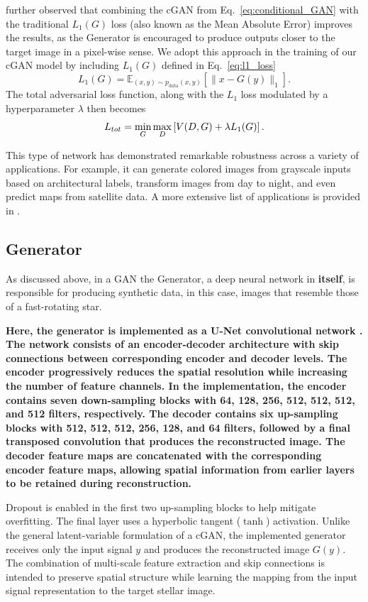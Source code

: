 \cite{isola2017image} further observed that combining the cGAN from Eq.~\ref{eq:conditional_GAN} with the traditional $L_1(G)$ loss (also known  as the Mean Absolute Error) improves the results, as the Generator is encouraged to produce outputs closer to the target image in a pixel-wise sense. We adopt this approach in the training of our cGAN model by including $L_1(G)$ defined in Eq.~\ref{eq:l1_loss}
\begin{equation}
	L_1(G) = \mathbb{E}_{(x,y)\sim p_{\mathrm{data}}(x,y)}\left[\lVert x-G(y)\rVert_1\right].
	\label{eq:l1_loss}
\end{equation}
The total adversarial loss function, along with the $L_1$ loss modulated by a hyperparameter $\lambda$ then becomes
\begin{equation}
	\centering
	L_{tot} = \min_G \max_D	\left[V(D,G)+\lambda L_1(G)\right].
	\label{eq:total_loss}
\end{equation}

This type of network has demonstrated remarkable robustness across a variety of applications. For example, it can generate colored images from grayscale inputs based on architectural labels, transform images from day to night, and even predict maps from satellite data. A more extensive list of applications is provided in \cite{isola2017image}.

\subsection{Generator}
As discussed above, in a GAN the Generator, a deep neural network in {\bf itself}, is responsible for producing synthetic data, in this case, images that resemble those of a fast-rotating star. {\bf Here, the generator is implemented as a U-Net convolutional network \citep{ronneberger2015u}. The network consists of an encoder-decoder architecture with skip connections between corresponding encoder and decoder levels. The encoder progressively reduces the spatial resolution while increasing the number of feature channels. In the implementation, the encoder contains seven down-sampling blocks with 64, 128, 256, 512, 512, 512, and 512 filters, respectively. The decoder contains six up-sampling blocks with 512, 512, 512, 256, 128, and 64 filters, followed by a final transposed convolution that produces the reconstructed image. The decoder feature maps are concatenated with the corresponding encoder feature maps, allowing spatial information from earlier layers to be retained during reconstruction.
	
Dropout is enabled in the first two up-sampling blocks to help mitigate overfitting. The final layer uses a hyperbolic tangent (\(\tanh\)) activation. Unlike the general latent-variable formulation of a cGAN, the implemented generator receives only the input signal \(y\) and produces the reconstructed image \(G(y)\). The combination of multi-scale feature extraction and skip connections is intended to preserve spatial structure while learning the mapping from the input signal representation to the target stellar image.}

